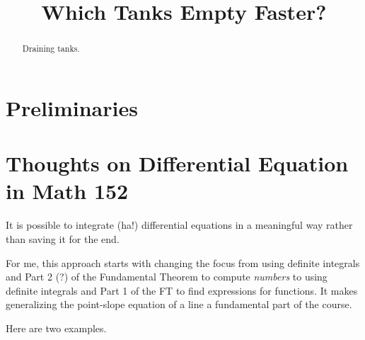 \documentclass{ximera}
\title{Which Tanks Empty Faster?}
\begin{document}
\begin{abstract}
Draining tanks.
\end{abstract}
\maketitle



\section{Preliminaries}

\section{Thoughts on Differential Equation in Math 152}

It is possible to integrate (ha!) differential equations in a meaningful way rather than saving it for the end.

For me, this approach starts with changing the focus from using definite integrals and Part 2 (?) of the Fundamental Theorem to compute \emph{numbers} to using definite integrals and Part 1 of the FT to find expressions for functions. It makes generalizing the point-slope equation of a line a fundamental part of the course.

Here are two examples.
\end{document}
